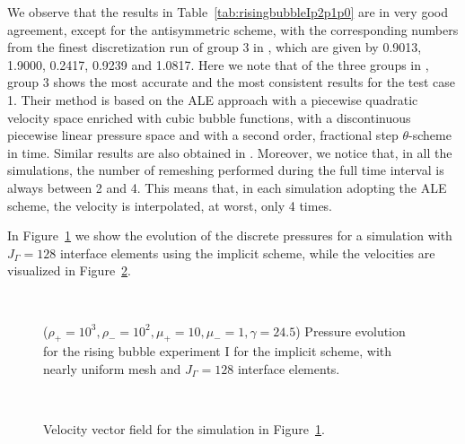 \documentclass[a4paper,12pt,onecolumn]{article}
\begin{document}
We observe that the results in Table~\ref{tab:risingbubbleIp2p1p0} are in very
good agreement, except for the antisymmetric scheme, with the corresponding
numbers from the finest discretization run of group 3 in \cite{HysingTKPBGT09},
which are given by 0.9013, 1.9000, 0.2417, 0.9239 and 1.0817. Here we note that
of the three groups in \cite{HysingTKPBGT09}, group 3 shows the most accurate
and the most consistent results for the test case 1. Their method is based on
the ALE approach with a piecewise quadratic velocity space enriched with cubic
bubble functions, with a discontinuous piecewise linear pressure space and with
a second order, fractional step $\theta$-scheme in time. Similar results are
also obtained in \cite[Tables ~2 and 3]{fluidfbp}.
Moreover, we notice that, in all the
simulations, the number of remeshing performed during the full time interval is
always between 2 and 4. This means that, in each simulation adopting the ALE
scheme, the velocity is interpolated, at worst, only 4 times.

In Figure~\ref{fig:risingbubbleIpressure} we show the evolution of the discrete
pressures for a simulation with $J_\Gamma=128$ interface elements using the
implicit scheme, while the velocities are visualized in
Figure~\ref{fig:risingbubbleIvelocity}.
\begin{figure}[htbp]
\centering
{}
\\
\caption[Navier--Stokes rising bubble I pressure]
{($\rho_+ = 10^3,\rho_- = 10^2,\mu_+ = 10,\mu_- =1,\gamma = 24.5$)
Pressure evolution for the rising bubble experiment I for the implicit scheme,
with nearly uniform mesh and $J_\Gamma=128$ interface elements.}
\label{fig:risingbubbleIpressure}
\end{figure}

\begin{figure}[htbp]
\centering
{}
\\
\caption[Navier--Stokes rising bubble I velocity]
{Velocity vector field for the simulation in
Figure~\ref{fig:risingbubbleIpressure}.}
\label{fig:risingbubbleIvelocity}
\end{figure}
\end{document}
